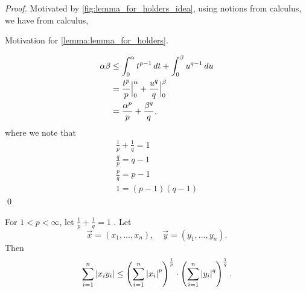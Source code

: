 \documentclass[notoc,notitlepage]{tufte-book}
\begin{document}
\begin{proof}
  Motivated by \cref{fig:lemma_for_holders_idea}, using notions from calculus, we have from calculus,
  \begin{marginfigure}
    \caption{Motivation for \cref{lemma:lemma_for_holders}.}
    \label{fig:lemma_for_holders_idea}
  \end{marginfigure}
  \begin{align*}
    \alpha \beta &\leq \int_{0}^{\alpha} t^{p - 1} \mathop{}\!d{t} + \int_{0}^{\beta} u^{q - 1} \mathop{}\!d{u} \\
                 &= \frac{t^p}{p} \Big|_{0}^{\alpha} + \frac{u^q}{q} \Big|_{0}^{\beta} \\
                 &= \frac{\alpha^p}{p} + \frac{\beta^q}{q},
  \end{align*}
  where we note that
  \begin{gather*}
    \frac{1}{p} + \frac{1}{q} = 1 \\
    \frac{q}{p} = q - 1 \\
    \frac{p}{q} = p - 1 \\
    1 = (p - 1)(q - 1)
  \end{gather*}\qed
\end{proof}

\begin{thm}
\label{thm:holder_s_inequality}
  For $1 < p < \infty$, let $\frac{1}{p} + \frac{1}{q} = 1$ . Let
  \begin{equation*}
    \vec{x} = ( x_1, ..., x_n ), \quad \vec{y} = ( y_1, ..., y_n ).
  \end{equation*}
  Then
  \begin{equation*}
    \sum_{i=1}^{n}  \left| x_i y_i \right| \leq \left( \sum_{i=1}^{n} \left|x_i\right|^p \right)^{\frac{1}{p}} \cdot \left( \sum_{i=1}^{n} \left|y_i\right|^q \right)^{\frac{1}{q}}.
  \end{equation*}
\end{thm}
\end{document}
